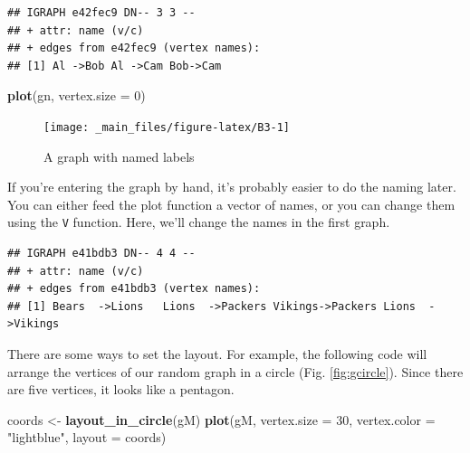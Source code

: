 \documentclass[
]{book}
\newenvironment{Shaded}{\begin{snugshade}}{\end{snugshade}}
\newcommand{\AttributeTok}[1]{\textcolor[rgb]{0.13,0.29,0.53}{#1}}
\newcommand{\DecValTok}[1]{\textcolor[rgb]{0.00,0.00,0.81}{#1}}
\newcommand{\FunctionTok}[1]{\textcolor[rgb]{0.13,0.29,0.53}{\textbf{#1}}}
\newcommand{\NormalTok}[1]{#1}
\newcommand{\OtherTok}[1]{\textcolor[rgb]{0.56,0.35,0.01}{#1}}
\newcommand{\SpecialCharTok}[1]{\textcolor[rgb]{0.81,0.36,0.00}{\textbf{#1}}}
\newcommand{\StringTok}[1]{\textcolor[rgb]{0.31,0.60,0.02}{#1}}
\theoremstyle{definition}
\theoremstyle{definition}
\theoremstyle{definition}
\theoremstyle{definition}
\theoremstyle{remark}
\begin{document}
\begin{verbatim}
## IGRAPH e42fec9 DN-- 3 3 -- 
## + attr: name (v/c)
## + edges from e42fec9 (vertex names):
## [1] Al ->Bob Al ->Cam Bob->Cam
\end{verbatim}

\begin{Shaded}
\begin{Highlighting}[]
\FunctionTok{plot}\NormalTok{(gn, }\AttributeTok{vertex.size =} \DecValTok{0}\NormalTok{)}
\end{Highlighting}
\end{Shaded}

\begin{figure}

{\centering \texttt{[image: \_main\_files/figure-latex/B3-1]} 

}

\caption{A graph with named labels}\label{fig:B3}
\end{figure}

If you're entering the graph by hand, it's probably easier to do the naming later. You can either feed the plot function a vector of names, or you can change them using the \texttt{V} function. Here, we'll change the names in the first graph.

\begin{Shaded}
\end{Shaded}

\begin{verbatim}
## IGRAPH e41bdb3 DN-- 4 4 -- 
## + attr: name (v/c)
## + edges from e41bdb3 (vertex names):
## [1] Bears  ->Lions   Lions  ->Packers Vikings->Packers Lions  ->Vikings
\end{verbatim}

There are some ways to set the layout. For example, the following code will arrange the vertices of our random graph in a circle (Fig. \ref{fig:gcircle}). Since there are five vertices, it looks like a pentagon.

\begin{Shaded}
\begin{Highlighting}[]
\NormalTok{coords }\OtherTok{\textless{}{-}} \FunctionTok{layout\_in\_circle}\NormalTok{(gM)}
\FunctionTok{plot}\NormalTok{(gM, }\AttributeTok{vertex.size =} \DecValTok{30}\NormalTok{, }\AttributeTok{vertex.color =} \StringTok{"lightblue"}\NormalTok{,}
     \AttributeTok{layout =}\NormalTok{ coords)}
\end{Highlighting}
\end{Shaded}
\end{document}
